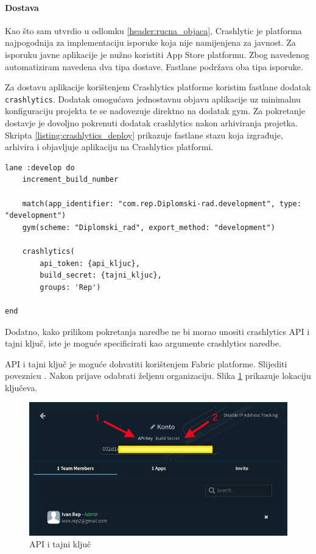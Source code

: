 \documentclass[times, utf8, diplomski, numeric]{fer}
\begin{document}
\begin{appendices}
\paragraph{Dostava}

Kao što sam utvrdio u odlomku \ref{header:rucna_objaca}, Crashlytic je platforma najpogodnija za implementaciju isporuke koja nije namijenjena za javnost. Za isporuku javne aplikacije je nužno koristiti App Store platformu. Zbog navedenog automatiziram navedena dva tipa dostave. Fastlane podržava oba tipa isporuke.

Za dostavu aplikacije korištenjem Crashlytics platforme koristim fastlane dodatak \verb|crashlytics|. Dodatak omogućava jednostavnu objavu aplikacije uz minimalnu konfiguraciju projekta te se nadovezuje direktno na dodatak gym. Za pokretanje dostavje je dovoljno pokrenuti dodatak crashlytics nakon arhiviranja projetka. Skripta \ref{listing:crashlytics_deploy} prikazuje fastlane stazu koja izgrađuje, arhivira i objavljuje aplikaciju na Crashlytics platformi.

\begin{lstlisting}[caption=Fastlane staza za isporuku korištenjem Crashlytics platforme, label=listing:crashlytics_deploy]
lane :develop do
    increment_build_number

    match(app_identifier: "com.rep.Diplomski-rad.development", type: "development")
    gym(scheme: "Diplomski_rad", export_method: "development")

    crashlytics(
        api_token: {api_kljuc},
        build_secret: {tajni_kljuc},
        groups: 'Rep')

end
\end{lstlisting}

Dodatno, kako prilikom pokretanja naredbe ne bi morao unositi crashlytics API i tajni ključ, iste je moguće specificirati kao argumente crashlytics naredbe.

API i tajni ključ je moguće dohvatiti korištenjem Fabric platforme. Slijediti poveznicu . Nakon prijave odabrati željenu organizaciju. Slika \ref{fig:FabricKeys} prikazuje lokaciju ključeva.

\begin{figure}
\centering
\includegraphics[scale=0.5]{FabricKeys}
\caption{API i tajni ključ}
\label{fig:FabricKeys}
\end{figure}


\end{appendices}
\end{document}
